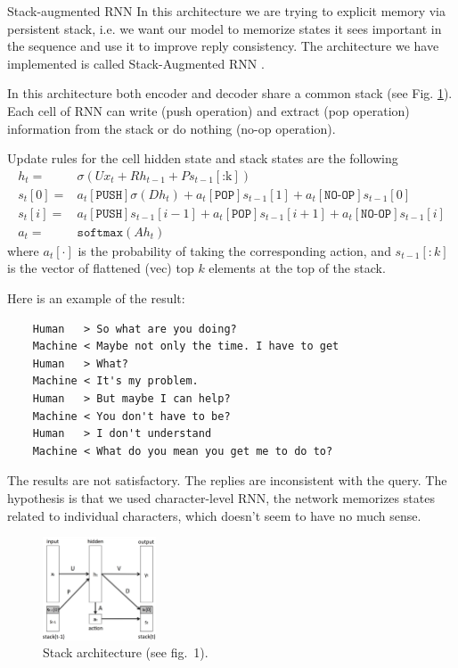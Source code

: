 \documentclass[12pt,a4paper]{article}
\begin{document}
\begin{section}{Stack-augmented RNN}
In this architecture we are trying to explicit memory via persistent stack, i.e. we
want our model to memorize states it sees important in the sequence and use it to
improve reply consistency. The architecture we have implemented is called Stack-Augmented
RNN \cite{2015arXiv150301007J}.

In this architecture both encoder and decoder share a common stack (see Fig. \ref{fig:stack}).
Each cell of RNN can write (push operation) and extract (pop operation) information
from the stack or do nothing (no-op operation).

Update rules for the cell hidden state and stack states are the following
\begin{align*}
h_t = & \sigma(U x_t + R h_{t - 1} + P s_{t-1}[\text{:k}]) \\
s_t[0] = & a_t[\texttt{PUSH}]\sigma(D h_t)
        + a_t[\texttt{POP}]s_{t-1}[1]
        + a_t[\texttt{NO-OP}]s_{t-1}[0] \\
s_t[i] = & a_t[\texttt{PUSH}]s_{t-1}[i-1]
        + a_t[\texttt{POP}]s_{t-1}[i+1]
        + a_t[\texttt{NO-OP}]s_{t-1}[i] \\
a_t = & \texttt{softmax}(A h_t)
\end{align*}
where $a_t[\cdot]$ is the probability of taking the corresponding action,
and $s_{t-1}[:k]$ is the vector of flattened (vec) top $k$ elements at the
top of the stack.

Here is an example of the result:
\footnotesize{
\begin{verbatim}
    Human   > So what are you doing?
    Machine < Maybe not only the time. I have to get
    Human   > What?
    Machine < It's my problem.
    Human   > But maybe I can help?
    Machine < You don't have to be?
    Human   > I don't understand
    Machine < What do you mean you get me to do to?
\end{verbatim}
}

\normalsize
The results are not satisfactory. The replies are inconsistent with the query. The
hypothesis is that we used character-level RNN, the network memorizes states related
to individual characters, which doesn't seem to have no much sense.

\begin{figure}
    \centering
    \includegraphics[width=0.3\textwidth]{figures/stack.png}
    \caption{Stack architecture (see \cite{2015arXiv150301007J} fig.~1).}
    \label{fig:stack}
\end{figure}


\end{section}
\end{document}
